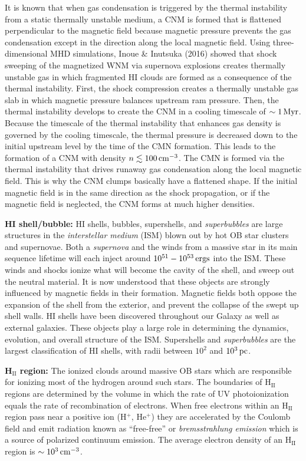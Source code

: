 \documentclass[a4paper,10pt]{article}
\begin{document}
{\noindent}It is known that when gas condensation is triggered by the thermal instability from a static thermally unstable medium, a CNM is formed that is flattened perpendicular to the magnetic field because magnetic pressure prevents the gas condensation except in the direction along the local magnetic field. Using three-dimensional MHD simulations, Inoue \& Inutsuka (2016) showed that shock sweeping of the magnetized WNM via supernova explosions creates thermally unstable gas in which fragmented HI clouds are formed as a consequence of the thermal instability. First, the shock compression creates a thermally unstable gas slab in which magnetic pressure balances upstream ram pressure. Then, the thermal instability develops to create the CNM in a cooling timescale of $\sim1\,{\rm Myr}$. Because the timescale of the thermal instability that enhances gas density is governed by the cooling timescale, the thermal pressure is decreased down to the initial upstream level by the time of the CMN formation. This leads to the formation of a CNM with density $n\lesssim100\,{\rm cm^{-3}}$. The CMN is formed via the thermal instability that drives runaway gas condensation along the local magnetic field. This is why the CNM clumps basically have a flattened shape. If the initial magnetic field is in the same direction as the shock propagation, or if the magnetic field is neglected, the CNM forms at much higher densities.

{\noindent}\textbf{HI shell/bubble:} HI shells, bubbles, supershells, and \textit{superbubbles} are large structures in the \textit{interstellar medium} (ISM) blown out by hot OB star clusters and supernovae. Both a \textit{supernova} and the winds from a massive star in its main sequence lifetime will each inject around $10^{51}-10^{53}\,{\rm ergs}$ into the ISM. These winds and shocks ionize what will become the cavity of the shell, and sweep out the neutral material. It is now understood that these objects are strongly influenced by magnetic fields in their formation. Magnetic fields both oppose the expansion of the shell from the exterior, and prevent the collapse of the swept up shell walls. HI shells have been discovered throughout our Galaxy as well as external galaxies. These objects play a large role in determining the dynamics, evolution, and overall structure of the ISM. Supershells and \textit{superbubbles} are the largest classification of HI shells, with radii between $10^2$ and $10^3\,{\rm pc}$.

{\noindent}\textbf{H$_\mathrm{II}$ region:} The ionized clouds around massive OB stars which are responsible for ionizing most of the hydrogen around such stars. The boundaries of H$_\mathrm{II}$ regions are determined by the volume in which the rate of UV photoionization equals the rate of recombination of electrons. When free electrons within an H$_\mathrm{II}$ region pass near a positive ion (H$^+$, He$^+$) they are accelerated by the Coulomb field and emit radiation known as ``free-free'' or \textit{bremsstrahlung emission} which is a source of polarized continuum emission. The average electron density of an H$_\mathrm{II}$ region is $\sim10^3\,{\rm cm^{-3}}$.
\end{document}
